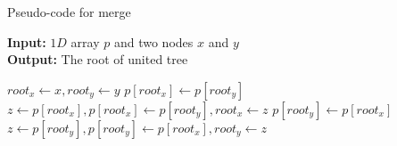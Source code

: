\begin{algorithm}[ht!]
\small
{
	\caption{Pseudo-code for merge\cite{Patwary2010_RemSP}}
	\label{alg:merge}
	\textbf{Input:} $1D$ array $p$ and two nodes $x$ and $y$ \\
	\textbf{Output:} The root of united tree 
	\begin{algorithmic}[1]
		\State $root_x \gets x, root_y \gets y$
					\State $p[root_x] \gets p[root_y]$
					\State {}
				\EndIf
				\State $z \gets p[root_x], p[root_x] \gets p[root_y], root_x \gets z$
			\Else
					\State $p[root_y] \gets p[root_x]$
					\State {}
				\EndIf
				\State $z \gets p[root_y], p[root_y] \gets p[root_x], root_y \gets z$
			\EndIf
		\EndWhile
		\State {}
	\EndFunction
	\end{algorithmic}	
}
\end{algorithm}
